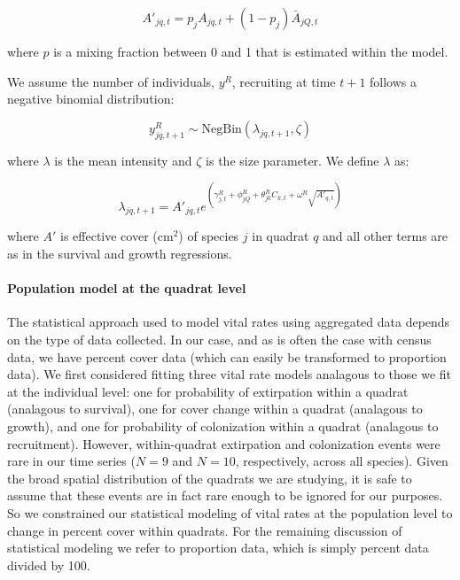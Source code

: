 \documentclass[12pt,]{article}
\begin{document}
\begin{equation}
A'_{jq,t} = p_{j}A_{jq,t} + (1-p_{j})\bar{A}_{jQ,t}
\end{equation}

where $p$ is a mixing fraction between 0 and 1 that is estimated within
the model.

We assume the number of individuals, $y^{R}$, recruiting at time $t+1$
follows a negative binomial distribution:

\begin{equation}
y^{R}_{jq,t+1} \sim \text{NegBin}(\lambda_{jq,t+1},\zeta)
\end{equation}

where $\lambda$ is the mean intensity and $\zeta$ is the size parameter.
We define $\lambda$ as:

\begin{equation}
\lambda_{jq,t+1} = A'_{jq,t}e^{(\gamma^{R}_{j,t} + \phi^{R}_{jQ} + \theta^{R}_{jk}C_{k,t} + \omega^{R}\sqrt{A'_{q,t}})}
\end{equation}

where $A'$ is effective cover ($\text{cm}^2$) of species $j$ in quadrat
$q$ and all other terms are as in the survival and growth regressions.

\paragraph{Population model at the quadrat
level}\label{population-model-at-the-quadrat-level}

The statistical approach used to model vital rates using aggregated data
depends on the type of data collected. In our case, and as is often the
case with census data, we have percent cover data (which can easily be
transformed to proportion data). We first considered fitting three vital
rate models analagous to those we fit at the individual level: one for
probability of extirpation within a quadrat (analagous to survival), one
for cover change within a quadrat (analagous to growth), and one for
probability of colonization within a quadrat (analagous to recruitment).
However, within-quadrat extirpation and colonization events were rare in
our time series ($N=9$ and $N=10$, respectively, across all species).
Given the broad spatial distribution of the quadrats we are studying, it
is safe to assume that these events are in fact rare enough to be
ignored for our purposes. So we constrained our statistical modeling of
vital rates at the population level to change in percent cover within
quadrats. For the remaining discussion of statistical modeling we refer
to proportion data, which is simply percent data divided by 100.
\end{document}
